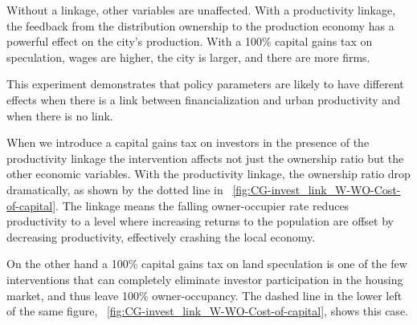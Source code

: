 Without a linkage, other variables are unaffected. With a productivity linkage, the feedback from the distribution ownership to the production economy has a powerful effect on the city's production. With a 100\% capital gains tax on speculation, wages are  higher, the city is larger, and there are more firms. 

 This experiment demonstrates that policy parameters are likely to have different effects when there is a link between financialization and urban productivity and when there is no link.


When we introduce a capital gains tax on investors in the presence of the productivity linkage the intervention affects not just the ownership ratio but the other economic variables. %
With the productivity linkage, the ownership ratio drop dramatically, as shown by the dotted line in ~\ref{fig:CG-invest_link_W-WO-Cost-of-capital}. The linkage means the falling owner-occupier rate reduces productivity to a level where increasing returns to the population are offset by decreasing productivity, effectively crashing the local economy. %

On the other hand a 100\% capital gains tax on land speculation is one of the few interventions that can completely eliminate investor participation in the housing market, and thus leave  100\%  owner-occupancy. The dashed line in the lower left of the same figure,  ~\ref{fig:CG-invest_link_W-WO-Cost-of-capital}, %
shows this case. %


